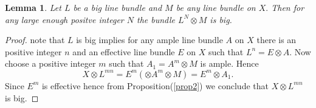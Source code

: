 \documentclass[10pt,a4paper]{amsart}
\newtheorem{lem}{Lemma}
\begin{document}
\begin{lem}\label{lem1}
Let $L$ be a big line bundle and $M$ be any line bundle on $X.$ Then for any large enough positve integer $N$ the bundle $L^N \otimes M$ is big. 
\end{lem}

\begin{proof}
 note that $L$ is big implies for any ample line bundle $A$ on $X$  there is an positive integer $n$ and an effective line bundle $E$ on $X$ such that $L^n = E \otimes A.$ 
Now choose a positive  integer $m$ such that $A_1 = A^m\otimes M$ is ample. Hence 
$$X\otimes L^{mn} = E^m (\otimes A^m \otimes M) = E^m \otimes A_1.$$
Since $E^m$ is effective hence from  Proposition(\ref{prop2}) we conclude that $X\otimes L^{mn}$ is big.
\end{proof}
\end{document}
